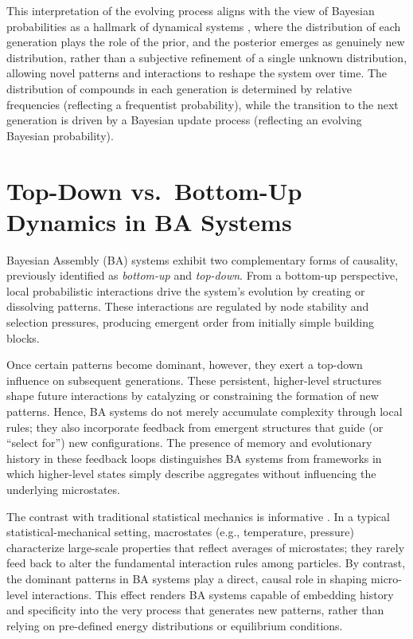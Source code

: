 \documentclass[entropy,article,submit,pdftex,moreauthors]{Definitions/mdpi}
\begin{document}
This interpretation of the evolving process aligns with the view of Bayesian probabilities as a hallmark of dynamical systems \cite{le2020equation}, where the distribution of each generation plays the role of the prior, and the posterior emerges as genuinely new distribution, rather than a subjective refinement of a single unknown distribution, allowing novel patterns and interactions to reshape the system over time. The distribution of compounds in each generation is determined by relative frequencies (reflecting a frequentist probability), while the transition to the next generation is driven by a Bayesian update process (reflecting an evolving Bayesian probability).

\section{Top-Down vs.\ Bottom-Up Dynamics in BA Systems}
\label{sec:topdown-bottomup}

Bayesian Assembly (BA) systems exhibit two complementary forms of causality, previously identified as \emph{bottom-up} and \emph{top-down}. From a bottom-up perspective, local probabilistic interactions drive the system's evolution by creating or dissolving patterns. These interactions are regulated by node stability and selection pressures, producing emergent order from initially simple building blocks. 

Once certain patterns become dominant, however, they exert a top-down influence on subsequent generations. These persistent, higher-level structures shape future interactions by catalyzing or constraining the formation of new patterns. Hence, BA systems do not merely accumulate complexity through local rules; they also incorporate feedback from emergent structures that guide (or ``select for'') new configurations. The presence of memory and evolutionary history in these feedback loops distinguishes BA systems from frameworks in which higher-level states simply describe aggregates without influencing the underlying microstates.

The contrast with traditional statistical mechanics is informative \cite{landau1980statistical}. In a typical statistical-mechanical setting, macrostates (e.g., temperature, pressure) characterize large-scale properties that reflect averages of microstates; they rarely feed back to alter the fundamental interaction rules among particles. By contrast, the dominant patterns in BA systems play a direct, causal role in shaping micro-level interactions. This effect renders BA systems capable of embedding history and specificity into the very process that generates new patterns, rather than relying on pre-defined energy distributions or equilibrium conditions.
\end{document}
